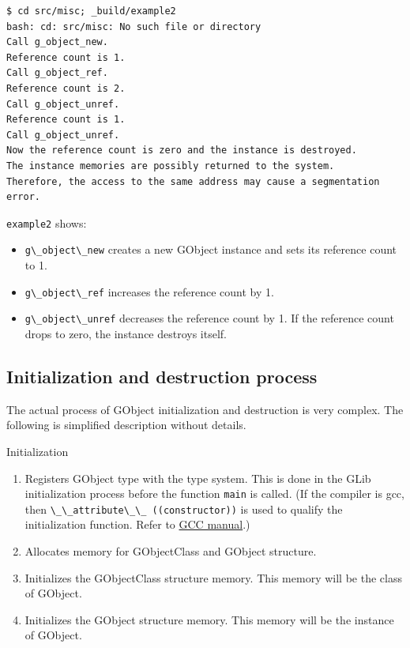 \begin{lstlisting}
$ cd src/misc; _build/example2
bash: cd: src/misc: No such file or directory
Call g_object_new.
Reference count is 1.
Call g_object_ref.
Reference count is 2.
Call g_object_unref.
Reference count is 1.
Call g_object_unref.
Now the reference count is zero and the instance is destroyed.
The instance memories are possibly returned to the system.
Therefore, the access to the same address may cause a segmentation error.
\end{lstlisting}

\passthrough{\lstinline!example2!} shows:

\begin{itemize}
\tightlist
\item
  \passthrough{\lstinline!g\_object\_new!} creates a new GObject
  instance and sets its reference count to 1.
\item
  \passthrough{\lstinline!g\_object\_ref!} increases the reference count
  by 1.
\item
  \passthrough{\lstinline!g\_object\_unref!} decreases the reference
  count by 1. If the reference count drops to zero, the instance
  destroys itself.
\end{itemize}

\subsection{Initialization and destruction
process}\label{initialization-and-destruction-process}

The actual process of GObject initialization and destruction is very
complex. The following is simplified description without details.

Initialization

\begin{enumerate}
\def\labelenumi{\arabic{enumi}.}
\tightlist
\item
  Registers GObject type with the type system. This is done in the GLib
  initialization process before the function
  \passthrough{\lstinline!main!} is called. (If the compiler is gcc,
  then \passthrough{\lstinline!\_\_attribute\_\_ ((constructor))!} is
  used to qualify the initialization function. Refer to
  \href{https://gcc.gnu.org/onlinedocs/gcc-10.2.0/gcc/Common-Function-Attributes.html\#Common-Function-Attributes}{GCC
  manual}.)
\item
  Allocates memory for GObjectClass and GObject structure.
\item
  Initializes the GObjectClass structure memory. This memory will be the
  class of GObject.
\item
  Initializes the GObject structure memory. This memory will be the
  instance of GObject.
\end{enumerate}


